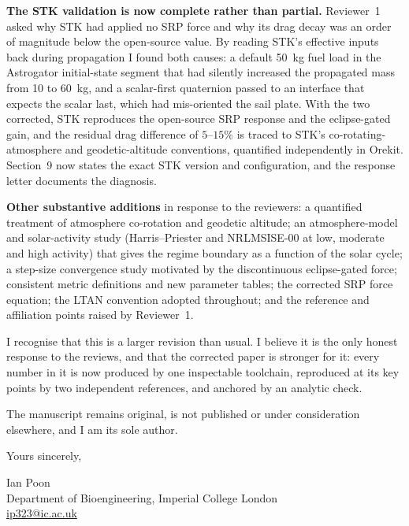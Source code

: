 \documentclass[11pt,a4paper]{article}
\begin{document}
\textbf{The STK validation is now complete rather than partial.} Reviewer~1 asked why STK had applied no SRP force and why its drag decay was an order of magnitude below the open-source value. By reading STK's effective inputs back during propagation I found both causes: a default 50~kg fuel load in the Astrogator initial-state segment that had silently increased the propagated mass from 10 to 60~kg, and a scalar-first quaternion passed to an interface that expects the scalar last, which had mis-oriented the sail plate. With the two corrected, STK reproduces the open-source SRP response and the eclipse-gated gain, and the residual drag difference of \(5\)--\(15\%\) is traced to STK's co-rotating-atmosphere and geodetic-altitude conventions, quantified independently in Orekit. Section~9 now states the exact STK version and configuration, and the response letter documents the diagnosis.

\textbf{Other substantive additions} in response to the reviewers: a quantified treatment of atmosphere co-rotation and geodetic altitude; an atmosphere-model and solar-activity study (Harris--Priester and NRLMSISE-00 at low, moderate and high activity) that gives the regime boundary as a function of the solar cycle; a step-size convergence study motivated by the discontinuous eclipse-gated force; consistent metric definitions and new parameter tables; the corrected SRP force equation; the LTAN convention adopted throughout; and the reference and affiliation points raised by Reviewer~1.

I recognise that this is a larger revision than usual. I believe it is the only honest response to the reviews, and that the corrected paper is stronger for it: every number in it is now produced by one inspectable toolchain, reproduced at its key points by two independent references, and anchored by an analytic check.

The manuscript remains original, is not published or under consideration elsewhere, and I am its sole author.

\vspace{0.25em}
\noindent Yours sincerely,

\vspace{0.7em}
\noindent
Ian Poon\\
Department of Bioengineering, Imperial College London\\
\href{mailto:ip323@ic.ac.uk}{ip323@ic.ac.uk}
\end{document}
